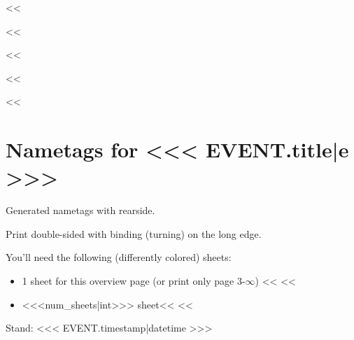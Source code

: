 <<%

<<%

<<%
    \geometry{top=2cm, bottom=2cm, left=1.5cm, right=1.5cm, head=1cm, foot=1cm}


    \chead[]{}
    \ohead[]{\rightmark}
    \cfoot[]{}

    \setlength{\fboxsep}{0pt}
    \setlength{\fboxrule}{.5pt}
    \setlength{\parindent}{0pt}
    \newsavebox{\ntcontent}
<<%

<<%
    \thispagestyle{plain}
    \section*{Nametags for <<< EVENT.title|e >>>}
    Generated nametags with rearside.

    Print double-sided with binding (turning) on the long edge.

    You'll need the following (differently colored) sheets:

    \begin{itemize}
        \item 1 sheet for this overview page (or print only page 3-$\infty$)
        <<%
            <<%
            \item <<<num_sheets|int>>> sheet<<%
        <<%
    \end{itemize}

    \vspace{3\baselineskip}

    Stand: <<< EVENT.timestamp|datetime >>>

    \newpage
    \null\newpage

